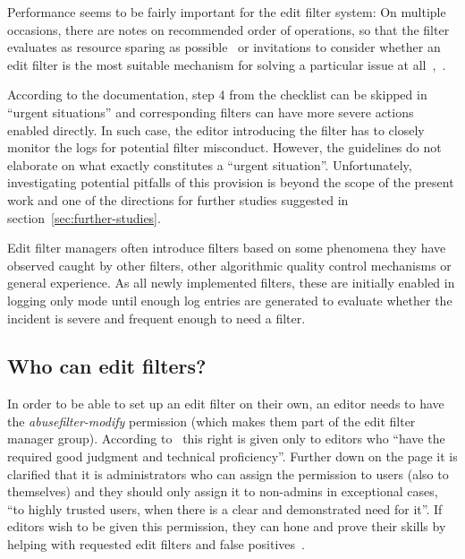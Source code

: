 Performance seems to be fairly important for the edit filter system:
On multiple occasions, there are notes on recommended order of operations, so that the filter evaluates as resource sparing as possible~\cite{Wikipedia:EditFilterInstructions} or invitations to consider whether an edit filter is the most suitable mechanism for solving a particular issue at all~\cite{Wikipedia:EditFilter},~\cite{Wikipedia:EditFilterRequested}.

According to the documentation, step 4 from the checklist can be skipped in ``urgent situations'' and corresponding filters can have more severe actions enabled directly. %
In such case, the editor introducing the filter has to closely monitor the logs for potential filter misconduct.
However, the guidelines do not elaborate on what exactly constitutes a ``urgent situation''.
Unfortunately, investigating potential pitfalls of this provision is beyond the scope of the present work and one of the directions for further studies suggested in section~\ref{sec:further-studies}.

Edit filter managers often introduce filters based on some phenomena they have observed caught by other filters, other algorithmic quality control mechanisms or general experience.
As all newly implemented filters, these are initially enabled in logging only mode until enough log entries are generated to evaluate whether the incident is severe and frequent enough to need a filter.


\subsection{Who can edit filters?}
\label{section:who-can-edit}

In order to be able to set up an edit filter on their own, an editor needs to have the \emph{abusefilter-modify} permission (which makes them part of the edit filter manager group).
According to~\cite{Wikipedia:EditFilter} this right is given only to editors who ``have the required good judgment and technical proficiency''.
Further down on the page it is clarified that it is administrators who can assign the permission to users (also to themselves) and they should only assign it to non-admins in exceptional cases, ``to highly trusted users, when there is a clear and demonstrated need for it''.
If editors wish to be given this permission, they can hone and prove their skills by helping with requested edit filters and false positives~\cite{Wikipedia:EditFilter}.

